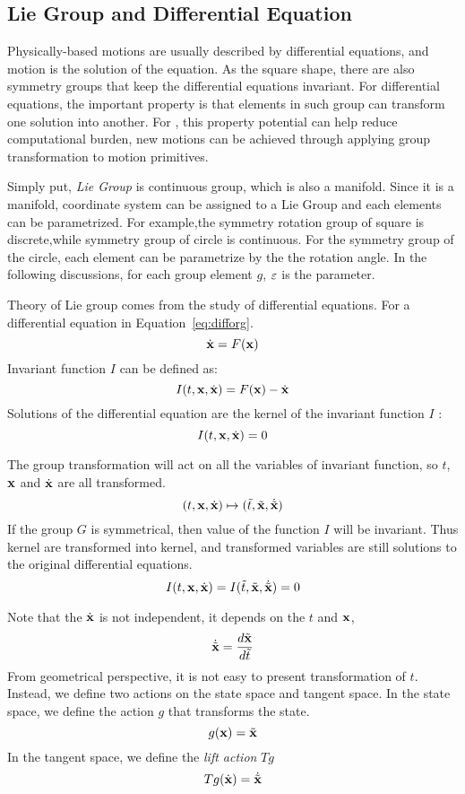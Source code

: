 \subsection{Lie Group and Differential Equation}
Physically-based motions are usually described by differential equations, and motion is the solution of the equation.
As the square shape, there are also symmetry groups that keep the differential equations invariant.
For differential equations, the important property is that elements in such group can transform one solution into another\citep{olver1986applications}.
For \cms, this property potential can help reduce computational burden, new motions can be achieved through applying group transformation to motion primitives.




Simply put, \emph{Lie Group} is continuous group, which is also a manifold.
Since it is a manifold, coordinate system can be assigned to a Lie Group and each elements can be parametrized.
For example,the symmetry rotation group of square is discrete,while symmetry group of circle is continuous.
For the symmetry group of the circle, each element can be parametrize by the the rotation angle.
In the following discussions, for each group element $g$, $\varepsilon$ is the parameter.

Theory of Lie group comes from the study of differential equations.
For a differential equation in Equation~\ref{eq:difforg}.
\begin{equation}
\label{eq:difforg}
\dot{\mathbf{x}}=F(\mathbf{x})
\end{equation}
Invariant function $I$ can be defined as:
\[
I(t,\mathbf{x},\dot{\mathbf{x}})=F(\mathbf{x})-\dot{\mathbf{x}}
\]
Solutions of the differential equation are the kernel of the invariant function $I$ :
 \[
 I(t,\mathbf{x},\dot{\mathbf{x}})=0
 \]
 
 
The group transformation will act on all the variables of invariant function, so $t$,$\mathbf{x}$ and $\dot{\mathbf{x}}$ are all transformed.
\[
(t,\mathbf{x},\dot{\mathbf{x}}) \mapsto (\tilde{t},\tilde{\mathbf{x}},\dot{\tilde{\mathbf{x}}})
\]
If the group $G$ is symmetrical, then value of the  function $I$ will be invariant.
Thus kernel are transformed into kernel, and transformed variables are still solutions to the original differential equations. 
\[
I(t,\mathbf{x},\dot{\mathbf{x}})=I(\tilde{t},\tilde{\mathbf{x}},\dot{\tilde{\mathbf{x}}})=0
\]


Note that the $\dot{\mathbf{x}}$ is not independent, it depends on the $t$ and $\mathbf{x}$,
\[
\dot{\tilde{\mathbf{x}}}=\frac{d \tilde{\mathbf{x}} }{d \tilde{t}}
\]
From geometrical perspective, it is not easy to present  transformation of $t$.
Instead, we define two actions on the state space and tangent space.
In the state space, we define the  action $g$ that transforms the state. 
\[
g(\mathbf{x})=\tilde{\mathbf{x}}
\]
In the tangent space, we define the \emph{lift action} $Tg$ 
\[
Tg(\dot{\mathbf{x}})=\dot{\tilde{\mathbf{x}}}
\]

